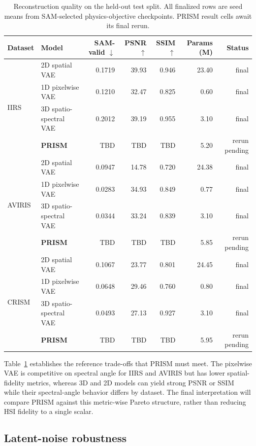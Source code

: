 \documentclass{article}
\newcommand{\tbd}{\textsc{TBD}}
\begin{document}
\begin{table}[t]
\centering
\small
\setlength{\tabcolsep}{4pt}
\begin{tabular}{llrrrrr}
\toprule
Dataset & Model & SAM-valid $\downarrow$ & PSNR $\uparrow$ & SSIM $\uparrow$ & Params (M) & Status \\
\midrule
\multirow{4}{*}{IIRS}
 & 2D spatial VAE & 0.1719 & 39.93 & 0.946 & 23.40 & final \\
 & 1D pixelwise VAE & 0.1210 & 32.47 & 0.825 & 0.60 & final \\
 & 3D spatio-spectral VAE & 0.2012 & 39.19 & 0.955 & 3.10 & final \\
 & \textbf{PRISM} & \tbd{} & \tbd{} & \tbd{} & 5.20 & rerun pending \\
\midrule
\multirow{4}{*}{AVIRIS}
 & 2D spatial VAE & 0.0947 & 14.78 & 0.720 & 24.38 & final \\
 & 1D pixelwise VAE & 0.0283 & 34.93 & 0.849 & 0.77 & final \\
 & 3D spatio-spectral VAE & 0.0344 & 33.24 & 0.839 & 3.10 & final \\
 & \textbf{PRISM} & \tbd{} & \tbd{} & \tbd{} & 5.85 & rerun pending \\
\midrule
\multirow{4}{*}{CRISM}
 & 2D spatial VAE & 0.1067 & 23.77 & 0.801 & 24.45 & final \\
 & 1D pixelwise VAE & 0.0648 & 29.46 & 0.760 & 0.80 & final \\
 & 3D spatio-spectral VAE & 0.0493 & 27.13 & 0.927 & 3.10 & final \\
 & \textbf{PRISM} & \tbd{} & \tbd{} & \tbd{} & 5.95 & rerun pending \\
\bottomrule
\end{tabular}
\caption{Reconstruction quality on the held-out test split. All finalized rows are seed means from SAM-selected physics-objective checkpoints. PRISM result cells await its final rerun.}
\label{tab:reconstruction}
\end{table}

Table~\ref{tab:reconstruction} establishes the reference trade-offs that PRISM must meet. The pixelwise VAE is competitive on spectral angle for IIRS and AVIRIS but has lower spatial-fidelity metrics, whereas 3D and 2D models can yield strong PSNR or SSIM while their spectral-angle behavior differs by dataset. The final interpretation will compare PRISM against this metric-wise Pareto structure, rather than reducing HSI fidelity to a single scalar.

\subsection{Latent-noise robustness}
\end{document}

